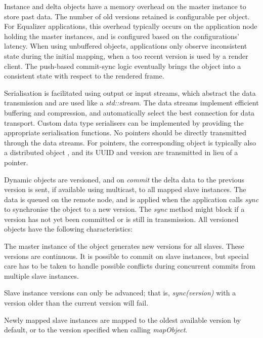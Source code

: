 Instance and delta objects have a memory overhead on the master instance to
store past data. The number of old versions retained is configurable per
object. For Equalizer applications, this overhead typically occurs on the
application node holding the master instances, and is configured based on the
configurations' latency. When using unbuffered objects, applications only
observe inconsistent state during the initial mapping, when a too recent
version is used by a render client. The push-based commit-sync logic eventually
brings the object into a consistent state with respect to the rendered frame.

Serialisation is facilitated using output or input streams, which abstract the
data transmission and are used like a {\em std::stream}. The data streams
implement efficient buffering and compression, and automatically select the best
connection for data transport. Custom data type serialisers can be implemented
by providing the appropriate serialisation functions. No pointers should be
directly transmitted through the data streams. For pointers, the corresponding
object is typically also a distributed object , and its UUID and version are
transmitted in lieu of a pointer.

Dynamic objects are versioned, and on {\em commit} the delta data to the
previous version is sent, if available using multicast, to all mapped slave
instances. The data is queued on the remote node, and is applied when the
application calls {\em sync} to synchronise the object to a new version. The
{\em sync} method might block if a version has not yet been committed or is
still in transmission. All versioned objects have the following characteristics:

\begin{compactitem}

\item The master instance of the object generates new versions for all slaves.
These versions are continuous. It is possible to commit on slave instances, but
special care has to be taken to handle possible conflicts during concurrent
commits from multiple slave instances.

\item Slave instance versions can only be advanced; that is,
{\em sync(version)} with a version older than the current version will fail.

\item Newly mapped slave instances are mapped to the oldest available version
by default, or to the version specified when calling {\em mapObject}.

\end{compactitem}

